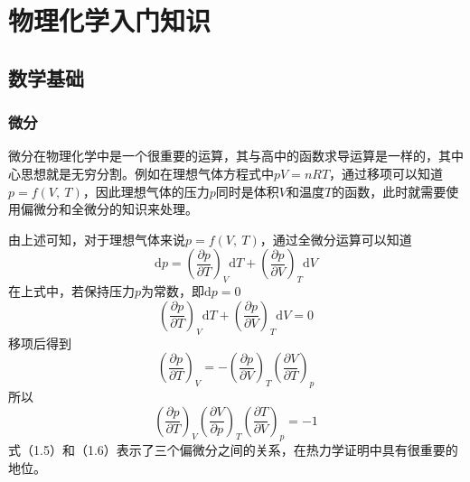 \documentclass[lang=cn,newtx,11pt,scheme=chinese]{elegantbook}
\begin{document}
\chapter{物理化学入门知识}


\section{数学基础}
\subsection{微分}
微分在物理化学中是一个很重要的运算，其与高中的函数求导运算是一样的，其中心思想就是无穷分割。例如在理想气体方程式中$pV=nRT$，通过移项可以知道$p=f(V, \ T)$，因此理想气体的压力$p$同时是体积$V$和温度$T$的函数，此时就需要使用偏微分和全微分的知识来处理。

由上述可知，对于理想气体来说$p=f(V, \ T)$，通过全微分运算可以知道
\begin{equation}
	\mathrm{d}p=\left ( \frac{\partial p}{\partial T}  \right )_V\mathrm{d}T +\left ( \frac{\partial p}{\partial V}  \right )_T\mathrm{d}V
\end{equation}
在上式中，若保持压力$p$为常数，即$\mathrm{d}p=0$
\begin{equation}
	\left ( \frac{\partial p}{\partial T}  \right )_V\mathrm{d}T +\left ( \frac{\partial p}{\partial V}  \right )_T\mathrm{d}V=0
\end{equation}
移项后得到
\begin{equation}
	\left ( \frac{\partial p}{\partial T}  \right )_V=-\left ( \frac{\partial p}{\partial V}  \right )_T\left ( \frac{\partial V}{\partial T}  \right )_p  
\end{equation}
所以
\begin{equation}
	\left ( \frac{\partial p}{\partial T}  \right )_V \left ( \frac{\partial V}{\partial p}  \right )_T \left ( \frac{\partial T}{\partial V}  \right )_p = -1
\end{equation}
式（1.5）和（1.6）表示了三个偏微分之间的关系，在热力学证明中具有很重要的地位。
\end{document}

